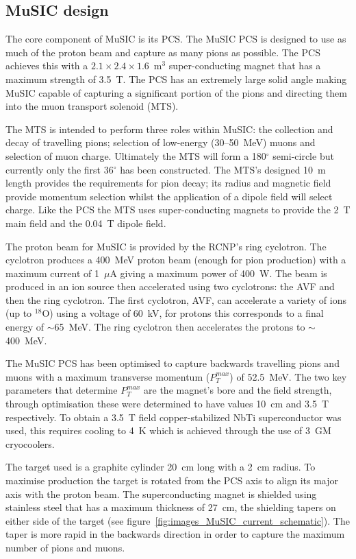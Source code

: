 \subsection{MuSIC design} %
\label{sec:music_design}
The core component of MuSIC is its PCS. The MuSIC PCS is designed to use as much of the proton beam and capture as many pions as possible. The PCS achieves this with a \(2.1\times2.4\times1.6\)~m\(^3\) super-conducting magnet that has a maximum strength of 3.5~T. The PCS has an extremely large solid angle making MuSIC capable of capturing a significant portion of the pions and directing them into the muon transport solenoid (MTS).

The MTS is intended to perform three roles within MuSIC: the collection and decay of travelling pions; selection of low-energy (30--50~MeV) muons and selection of muon charge. Ultimately the MTS will form a 180\(^{\circ}\) semi-circle but currently only the first 36\(^{\circ}\) has been constructed. The MTS's designed 10~m length provides the requirements for pion decay; its radius and magnetic field provide momentum selection whilst the application of a dipole field will select charge. Like the PCS the MTS uses super-conducting magnets to provide the 2~T main field and the 0.04~T dipole field.

The proton beam for MuSIC is provided by the RCNP's ring cyclotron. The cyclotron produces a 400~MeV proton beam (enough for pion production) with a maximum current of 1~\(\mu\)A giving a maximum power of 400~W. The beam is produced in an ion source then accelerated using two cyclotrons: the AVF and then the ring cyclotron. The first cyclotron, AVF, can accelerate a variety of ions (up to \(^{18}\)O) using a voltage of 60~kV, for protons this corresponds to a final energy of \(\sim\)65~MeV. The ring cyclotron then accelerates the protons to \( \sim \)400~MeV. 

The MuSIC PCS has been optimised to capture backwards travelling pions and muons with a maximum transverse momentum (\(P_{T}^{max}\)) of 52.5~MeV. The two key parameters that determine \(P_{T}^{max}\) are the magnet's bore and the field strength, through optimisation these were determined to have values 10~cm and 3.5~T respectively. To obtain a 3.5~T field copper-stabilized NbTi superconductor was used, this requires cooling to 4~K which is achieved through the use of 3~GM cryocoolers. 

The target used is a graphite cylinder 20~cm long with a 2~cm radius. To maximise production the target is rotated from the PCS axis to align its major axis with the proton beam. The superconducting magnet is shielded using stainless steel that has a maximum thickness of 27~cm, the shielding tapers on either side of the target (see figure~\ref{fig:images_MuSIC_current_schematic}). The taper is more rapid in the backwards direction in order to capture the maximum number of pions and muons.  

